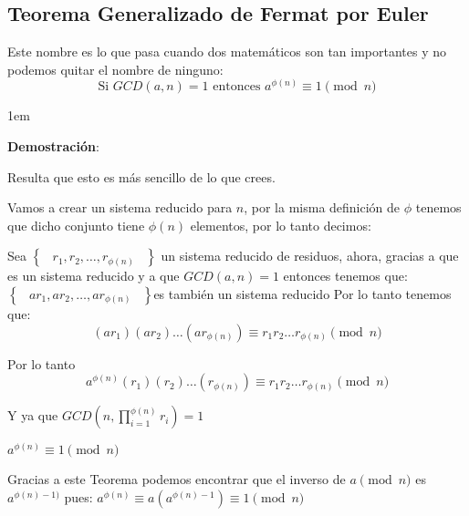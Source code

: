 \documentclass[12pt, fleqn]{report}                             %
\newenvironment{SmallIndentation}[1][0.75em]                    %
    {\begin{adjustwidth}{#1}{}\begin{footnotesize}}                 %
    {\end{footnotesize}\end{adjustwidth}}                           %
\DeclareMathOperator \Space {\quad}                             %
\DeclareMathOperator \MiniSpace {\;}                            %
\newcommand{\Set}[1]{\left\{ \MiniSpace #1 \MiniSpace \right\}} %
\begin{document}
        \subsection{Teorema Generalizado de Fermat por Euler}

            Este nombre es lo que pasa cuando dos matemáticos son tan importantes
            y no podemos quitar el nombre de ninguno:
            \begin{equation}
                \text{Si } GCD(a, n) = 1
                \text{ entonces }
                a^{\phi(n)} \equiv 1 \pmod{n}
            \end{equation}

            \begin{SmallIndentation}[1em]
                \textbf{Demostración}:

                Resulta que esto es más sencillo de lo que crees.

                Vamos a crear un sistema reducido para $n$, por la misma definición de $\phi$
                tenemos que dicho conjunto tiene $\phi(n)$ elementos, por lo tanto decimos:
                
                Sea $\Set{r_1, r_2, \dots, r_{\phi(n)}}$ un sistema reducido
                de residuos, ahora, gracias a que es un sistema reducido y a 
                que $GCD(a, n) = 1$ entonces tenemos que:
                $\Set{ar_1, ar_2, \dots, ar_{\phi(n)}}$es también un sistema reducido
                Por lo tanto tenemos que:
                \begin{equation*}
                    (ar_1)(ar_2)\dots(ar_{\phi(n)})
                    \equiv
                    r_1 r_2 \dots r_{\phi(n)} \pmod{n}
                \end{equation*}

                Por lo tanto
                \begin{equation*}
                    a^{\phi(n)}(r_1)(r_2)\dots(r_{\phi(n)})
                    \equiv
                    r_1 r_2 \dots r_{\phi(n)} \pmod{n}
                \end{equation*}

                Y ya que $GCD(n, \prod_{i=1}^{\phi(n)} r_i) = 1$

                $a^{\phi(n)} \equiv 1 \pmod{n}$

            \end{SmallIndentation} 


            Gracias a este Teorema podemos encontrar que el inverso de
            $a \pmod{n}$ es $a^{\phi(n) -1)}$ pues:
            $a^{\phi(n)} \equiv a(a^{\phi(n)-1}) \equiv 1 \pmod{n}$        
\end{document}
